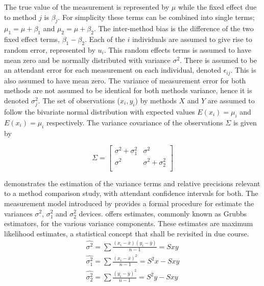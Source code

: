 \documentclass[12pt, a4paper]{report}
\theoremstyle{plain}
\theoremstyle{definition}
\theoremstyle{remark}
\begin{document}
The true value of the measurement is represented by $\mu$ while the fixed effect due to method $j$ is $\beta_{j}$.
For simplicity these terms can be combined into single terms; $\mu_{1} = \mu+ \beta_{1}$ and $\mu_{2} = \mu + \beta_{2}$. The inter-method bias is the difference of the two fixed effect terms, $\beta_{1}-\beta_{2}$. Each of the $i$ individuals are assumed to give rise to random error, represented by $u_{i}$. This random effects terms is assumed to have mean zero and be normally distributed with variance $\sigma^2$. There is assumed to be an attendant error for each measurement on each individual, denoted $\epsilon_{ij}$. This is also assumed to have mean zero. The variance of measurement error for both methods are not assumed to be identical for both methods variance,  hence it is denoted $\sigma^2_{j}$. The set of observations ($x_{i},y_{i}$) by methods $X$ and $Y$ are assumed to follow the bivariate normal distribution with expected values $E(x_{i})= \mu_{i}$ and $E(x_{i})= \mu_{i}$ respectively. The variance covariance of the observations $\Sigma$ is given by

\[
\Sigma = \left[
\begin{array}{cc}
\sigma^{2} + \sigma^{2}_{1} & \sigma^{2} \\
\sigma^{2} & \sigma^{2} + \sigma^{2}_{2} \\
\end{array}
\right]
\]

\citet{Kinsella} demonstrates the estimation of the variance terms and relative precisions relevant to a method comparison study, with attendant confidence intervals for both. The measurement model introduced by \citet{Grubbs48,Grubbs73} provides a formal procedure for estimate the variances $\sigma^2$, $\sigma^2_{1}$ and $\sigma^2_{2}$ devices. \citet{Grubbs48} offers estimates, commonly known as Grubbs estimators, for the various variance components. These estimates are maximum likelihood estimates, a statistical concept that shall be revisited in due course.
\begin{eqnarray*}
	\hat{\sigma^{2}} = \sum{\frac{(x_{i}-\bar{x})(y_{i}-\bar{y})}{n-1}} = Sxy\\
	\hat{\sigma^{2}_{1}} = \sum{\frac{(x_{i}-\bar{x})^{2}}{n-1}} =S^{2}x - Sxy  \\
	\hat{\sigma^{2}_{2}} =
	\sum{\frac{(y_{i}-\bar{y})^{2}}{n-1}} = S^{2}y - Sxy
\end{eqnarray*}

\end{document}

